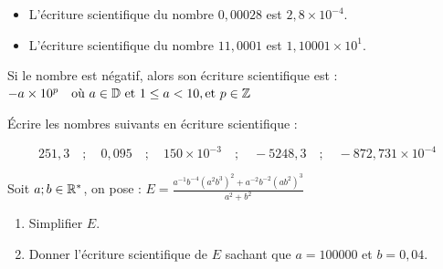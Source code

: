 \documentclass[10pt, a4paper]{article}
\begin{document}
\begin{Exemple}[][5 min]
\begin{itemize}
    \item L'écriture scientifique du nombre $0{,}00028$ est $2{,}8 \times 10^{-4}$.
    \item L'écriture scientifique du nombre $11{,}0001$ est $1{,}10001 \times 10^{1}$.
\end{itemize}
\end{Exemple}

\begin{Remarque}
Si le nombre est négatif, alors son écriture scientifique est :
    $-a \times 10^p \quad \text{où} ~ a \in \mathbb{D} ~ \text{et} ~ 1 \leq a < 10, \text{et} ~ p \in \mathbb{Z}$
\end{Remarque}

\begin{Application}[][10 min]
Écrire les nombres suivants en écriture scientifique :

\[
251{,}3 \quad ; \quad 0{,}095  \quad ; \quad 150 \times 10^{-3} \quad ; \quad -5248{,}3 \quad ; \quad -872{,}731 \times 10^{-4}
\]
\end{Application}

\begin{Application}[][10 min]
Soit $a ; b \in \mathbb{R}^*$, on pose : \quad
$E = \frac{a^{-1}b^{-4}\left(a^2b^3\right)^2 + a^{-2}b^{-2}\left(ab^2\right)^3}{a^2 + b^2}$
\begin{enumerate}
    \item Simplifier $E$.
    \item Donner l'écriture scientifique de $E$ sachant que $a = 100000$ et $b = 0{,}04$.
\end{enumerate}
\end{Application}
\end{document}
